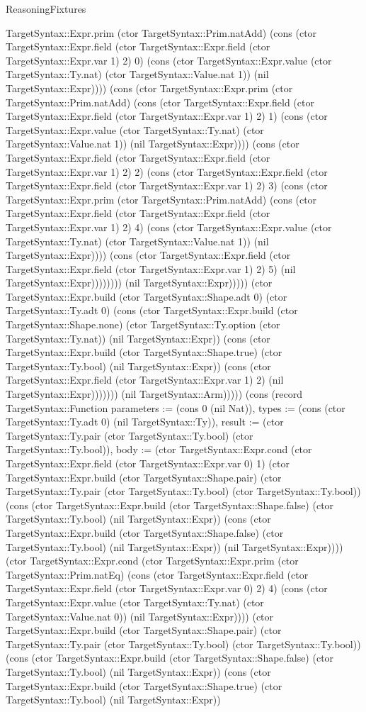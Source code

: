 \begin{lexlean}{ReasoningFixtures}
\begin{semanticmodule}
{TargetSyntax::Expr.prim (ctor TargetSyntax::Prim.natAdd) (cons (ctor TargetSyntax::Expr.field (ctor TargetSyntax::Expr.field (ctor TargetSyntax::Expr.var 1) 2) 0) (cons (ctor TargetSyntax::Expr.value (ctor TargetSyntax::Ty.nat) (ctor TargetSyntax::Value.nat 1)) (nil TargetSyntax::Expr)))) (cons (ctor TargetSyntax::Expr.prim (ctor TargetSyntax::Prim.natAdd) (cons (ctor TargetSyntax::Expr.field (ctor TargetSyntax::Expr.field (ctor TargetSyntax::Expr.var 1) 2) 1) (cons (ctor TargetSyntax::Expr.value (ctor TargetSyntax::Ty.nat) (ctor TargetSyntax::Value.nat 1)) (nil TargetSyntax::Expr)))) (cons (ctor TargetSyntax::Expr.field (ctor TargetSyntax::Expr.field (ctor TargetSyntax::Expr.var 1) 2) 2) (cons (ctor TargetSyntax::Expr.field (ctor TargetSyntax::Expr.field (ctor TargetSyntax::Expr.var 1) 2) 3) (cons (ctor TargetSyntax::Expr.prim (ctor TargetSyntax::Prim.natAdd) (cons (ctor TargetSyntax::Expr.field (ctor TargetSyntax::Expr.field (ctor TargetSyntax::Expr.var 1) 2) 4) (cons (ctor TargetSyntax::Expr.value (ctor TargetSyntax::Ty.nat) (ctor TargetSyntax::Value.nat 1)) (nil TargetSyntax::Expr)))) (cons (ctor TargetSyntax::Expr.field (ctor TargetSyntax::Expr.field (ctor TargetSyntax::Expr.var 1) 2) 5) (nil TargetSyntax::Expr)))))))) (nil TargetSyntax::Expr))))) (ctor TargetSyntax::Expr.build (ctor TargetSyntax::Shape.adt 0) (ctor TargetSyntax::Ty.adt 0) (cons (ctor TargetSyntax::Expr.build (ctor TargetSyntax::Shape.none) (ctor TargetSyntax::Ty.option (ctor TargetSyntax::Ty.nat)) (nil TargetSyntax::Expr)) (cons (ctor TargetSyntax::Expr.build (ctor TargetSyntax::Shape.true) (ctor TargetSyntax::Ty.bool) (nil TargetSyntax::Expr)) (cons (ctor TargetSyntax::Expr.field (ctor TargetSyntax::Expr.var 1) 2) (nil TargetSyntax::Expr))))))) (nil TargetSyntax::Arm))))}) (cons (record TargetSyntax::Function {parameters := (cons 0 (nil Nat)), types := (cons (ctor TargetSyntax::Ty.adt 0) (nil TargetSyntax::Ty)), result := (ctor TargetSyntax::Ty.pair (ctor TargetSyntax::Ty.bool) (ctor TargetSyntax::Ty.bool)), body := (ctor TargetSyntax::Expr.cond (ctor TargetSyntax::Expr.field (ctor TargetSyntax::Expr.var 0) 1) (ctor TargetSyntax::Expr.build (ctor TargetSyntax::Shape.pair) (ctor TargetSyntax::Ty.pair (ctor TargetSyntax::Ty.bool) (ctor TargetSyntax::Ty.bool)) (cons (ctor TargetSyntax::Expr.build (ctor TargetSyntax::Shape.false) (ctor TargetSyntax::Ty.bool) (nil TargetSyntax::Expr)) (cons (ctor TargetSyntax::Expr.build (ctor TargetSyntax::Shape.false) (ctor TargetSyntax::Ty.bool) (nil TargetSyntax::Expr)) (nil TargetSyntax::Expr)))) (ctor TargetSyntax::Expr.cond (ctor TargetSyntax::Expr.prim (ctor TargetSyntax::Prim.natEq) (cons (ctor TargetSyntax::Expr.field (ctor TargetSyntax::Expr.field (ctor TargetSyntax::Expr.var 0) 2) 4) (cons (ctor TargetSyntax::Expr.value (ctor TargetSyntax::Ty.nat) (ctor TargetSyntax::Value.nat 0)) (nil TargetSyntax::Expr)))) (ctor TargetSyntax::Expr.build (ctor TargetSyntax::Shape.pair) (ctor TargetSyntax::Ty.pair (ctor TargetSyntax::Ty.bool) (ctor TargetSyntax::Ty.bool)) (cons (ctor TargetSyntax::Expr.build (ctor TargetSyntax::Shape.false) (ctor TargetSyntax::Ty.bool) (nil TargetSyntax::Expr)) (cons (ctor TargetSyntax::Expr.build (ctor TargetSyntax::Shape.true) (ctor TargetSyntax::Ty.bool) (nil TargetSyntax::Expr)) }
\end{semanticmodule}
\end{lexlean}
